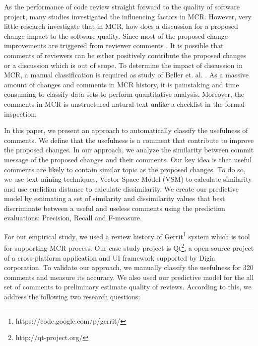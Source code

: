 \documentclass[conference]{IEEEtran}
\begin{document}
As the performance of code review straight forward to the quality of software project, many studies investigated the influencing factors in MCR\cite{Baysal2001,Mcintosh,Beller,Hamasaki2013}. However, very little research investigate that in MCR, how does a discussion for a proposed change impact to the software quality. Since most of the proposed change improvements are triggered from reviewer comments \cite{Beller}. 
It is possible that comments of reviewers can be either positively contribute the proposed changes or a discussion which is out of scope.
To determine the impact of discussion in MCR, a manual classification is required as study of Beller et. al. \cite{Beller}. As a massive amount of changes and comments in MCR history\cite{Balachandran2013,Thongtanunam2014}, it is painstaking and time consuming to classify data sets to perform quantitative analysis. Moreover, the comments in MCR is unstructured natural text unlike a checklist in the formal inspection. 

In this paper, we present an approach to automatically classify the usefulness of comments. We define that the usefulness is a comment that contribute to improve the proposed changes. In our approach, we analyze the similarity between commit message of the proposed changes and their comments. Our key idea is that useful comments are likely to contain similar topic as the proposed changes. To do so, we use text mining techniques, Vector Space Model (VSM) to calculate similarity and use euclidian distance to calculate dissimilarity. 
We create our predictive model by estimating a set of similarity and dissimilarity values that best discriminate between a useful and useless comments using the prediction evaluations: Precision, Recall and F-measure.

For our empirical study, we used a review history of Gerrit\footnote{https://code.google.com/p/gerrit/} system which is tool for supporting MCR process. Our case study project is Qt\footnote{http://qt-project.org/}, a open source project of a cross-platform application and UI framework supported by Digia corporation. To validate our approach, we manually classify the usefulness for 320 comments and measure its accuracy. We also used our predictive model for the all set of comments to preliminary estimate quality of reviews. According to this, we address the following two research questions:
\end{document}
